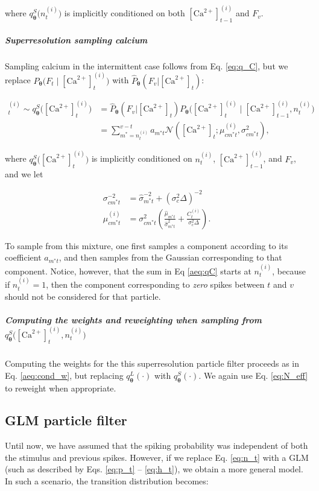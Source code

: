 \documentclass[10pt]{article}
\providecommand{\ve}[1]{\boldsymbol{#1}}
\providecommand{\ve}[1]{\boldsymbol{#1}}
\newcommand{\thetn}{\ve{\theta}}
\newcommand{\p}{P_{\thetn}}
\newcommand{\phat}{\widehat{P}_{\thetn}(F_v | \Ca_t)}
\newcommand{\m}{m^{\ast}}
\newcommand{\Ca}{[\text{Ca}^{2+}]}
\begin{document}
\noindent where $q_{\thetn}^{S}\big(n_t^{(i)}\big)$ is implicitly conditioned on both $\Ca_{t-1}^{(i)}$ and $F_v$.

\subparagraph{Superresolution sampling calcium}

Sampling calcium in the intermittent case follows from Eq. \ref{eq:q_C}, but we replace $\p\big(F_t \mid \Ca_t^{(i)}\big)$ with $\phat$: 

\begin{align} %
\Ca_t^{(i)} \sim q_{\thetn}^{S}\big(\Ca_t^{(i)}\big) &=\phat \p\big(\Ca_t^{(i)} \mid \Ca_{t-1}^{(i)}, n_t^{(i)}) \nonumber
\\ &=\sum_{\m=n_t^{(i)}}^{v-t} a_{\m t} \mathcal{N}\left(\Ca_t; \mu_{c\m t}^{(i)}, \sigma^2_{c\m t} \right), \label{aeq:qC}
\end{align}

\noindent where $q_{\thetn}^{S}\big(\Ca_t^{(i)}\big)$ is implicitly conditioned on $n_t^{(i)}$, $\Ca_{t-1}^{(i)}$, and $F_v$, and we let

\begin{align}
\sigma^{-2}_{c\m t} &= \widehat{\sigma}_{\m t}^{-2} + (\sigma_c^2 \Delta)^{-2}\\
\mu^{(i)}_{c\m t} &=\sigma^2_{c\m t} \left( \frac{\widehat{\mu}_{\m t}}{\widehat{\sigma}_{\m t}^2} + \frac{C_t^{(i)}}{\sigma_c^2 \Delta}\right).
\end{align}

To sample from this mixture, one first samples a component according to its coefficient $a_{\m t}$, and then samples from the Gaussian corresponding to that component.  Notice, however, that the sum in Eq \ref{aeq:qC} starts at $n_t^{(i)}$, because if $n_t^{(i)}=1$, then the component corresponding to \emph{zero} spikes between $t$ and $v$ should not be considered for that particle.

\subparagraph{Computing the weights and reweighting when sampling from $q_{\thetn}^{S}\big(\Ca_t^{(i)}, n_t^{(i)}\big)$} 

Computing the weights for the this superresolution particle filter proceeds as in Eq. \ref{aeq:cond_w}, but replacing $q_{\thetn}^L(\cdot)$ with $q_{\thetn}^{S}(\cdot)$. We again use Eq. \ref{eq:N_eff} to reweight when appropriate.

\subsection{GLM particle filter} \label{sec:GOOPSI}

Until now, we have assumed that the spiking probability was independent of both the stimulus and previous spikes.  However, if we replace Eq. \ref{eq:n_t} with a GLM (such as described by Eqs. \ref{eq:p_t} -- \ref{eq:h_t}), we obtain a more general model.  In such a scenario, the transition distribution becomes:
\end{document}
